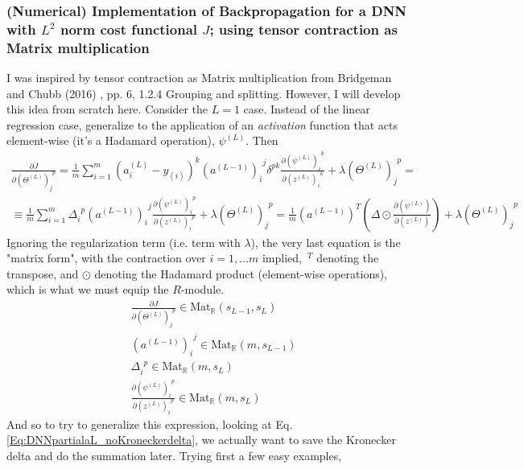 \documentclass[10pt]{amsart}
\begin{document}
\begin{multicols*}{2}
\subsubsection{(Numerical) Implementation of Backpropagation for a DNN with $L^2$ norm cost functional $J$; using tensor contraction as Matrix multiplication}
I was inspired by tensor contraction as Matrix multiplication from Bridgeman and Chubb (2016) \cite{BrCh2016}, pp. 6, 1.2.4 Grouping and splitting.  However, I will develop this idea from scratch here.  
Consider the $L=1$ case.  Instead of the linear regression case, generalize to the application of an \emph{activation} function that acts element-wise (it's a Hadamard operation), $\psi^{(L)}$.  Then
\[
\begin{gathered}
\frac{ \partial J}{ \partial (\Theta^{(L)})_j^{\  \  p} } = \frac{1}{m} \sum_{i=1}^m (a_i^{(L)} - y_{(i)})^k (a^{(L-1)})_i^{\  \  j} \delta^{pk} \frac{ \partial (\psi^{(L)})_i^{\  \  k} }{ \partial (z^{(L)})_i^{\  \  k} } + \lambda (\Theta^{(L)})_j^{\  \  p}  = \\
\equiv \frac{1}{m} \sum_{i=1}^m \Delta_i^{\  \   p} (a^{(L-1)})_i^{\  \  j} \frac{ \partial ( \psi^{(L)})_i^{\  \  p} }{ \partial (z^{(L)})_i^{\  \  p} } + \lambda (\Theta^{(L)})_j^{\  \  p} = \frac{1}{m} (a^{(L-1)})^T \left( \Delta \odot \frac{ \partial (\psi^{(L)}) }{ \partial (z^{(L)})}  \right) + \lambda (\Theta^{(L)})_j^{\  \  p}
\end{gathered}
\]
Ignoring the regularization term (i.e. term with $\lambda$), the very last equation is the "matrix form", with the contraction over $i=1, \dots m$ implied, ${\, }^T$ denoting the transpose, and $\odot$ denoting the Hadamard product (element-wise operations), which is what we must equip the $R$-module.  
\[
\begin{aligned}
& \frac{\partial J}{ \partial (\Theta^{(L)})_j^{\  \  p}} \in \text{Mat}_{\mathbb{R} }(s_{L-1}, s_L) \\ 
& (a^{(L-1)})_i^{\  \ j } \in \text{Mat}_{\mathbb{R}}(m,s_{L-1}) \\
& \Delta_i^{\  \  p} \in \text{Mat}_{\mathbb{R}}(m,s_L) \\ 
& \frac{ \partial (\psi^{(L)})_i^{\  \  p} }{ \partial (z^{(L)})_i^{\  \  p} } \in \text{Mat}_{\mathbb{R}}(m,s_L) 
\end{aligned}
\]
And so to try to generalize this expression, looking at Eq. \ref{Eq:DNNpartialaL_noKroneckerdelta}, we actually want to save the Kronecker delta and do the summation later.  Trying first a few easy examples, 
\begin{equation}

\end{equation}
\end{multicols*}
\end{document}

